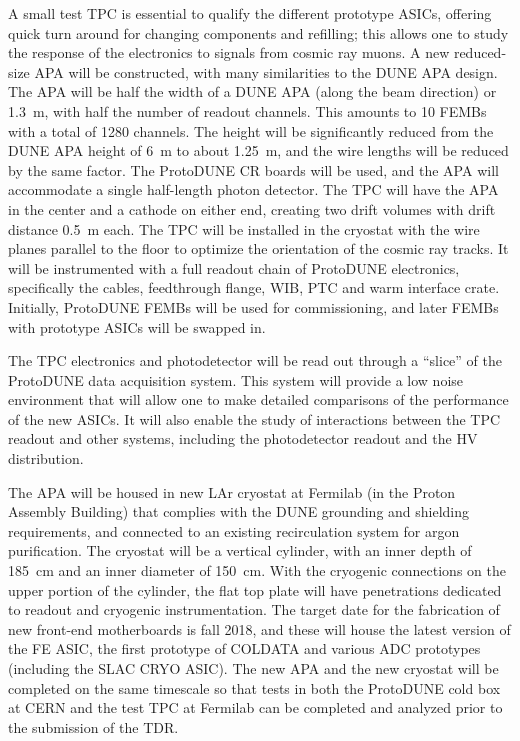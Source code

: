 A small test TPC is essential to qualify the different prototype ASICs, offering quick turn around for changing components and refilling; this allows one to study the response of the electronics to signals from cosmic ray muons.  A new reduced-size APA will be constructed, with many similarities to the DUNE APA design.  The APA will be half the width of a DUNE APA (along the beam direction) or 1.3~m, with half the number of readout channels.  This amounts to 10 FEMBs with a total of 1280 channels.  The height will be significantly reduced from the DUNE APA height of 6~m to about 1.25~m, and the wire lengths will be reduced by the same factor.  The ProtoDUNE CR boards will be used, and  the APA will accommodate a single half-length photon detector.  The TPC will have the APA in the center and a cathode on either end, creating two drift volumes with drift distance 0.5~m each.  The TPC will be installed in the cryostat with the wire planes parallel to the floor to optimize the orientation of the cosmic ray tracks.  It will be instrumented with a full readout chain of ProtoDUNE electronics, specifically  the cables, feedthrough flange, WIB, PTC and warm interface crate.  Initially, ProtoDUNE FEMBs will be used for commissioning, and later FEMBs with prototype ASICs will be swapped in.

The TPC electronics and photodetector will be read out through a ``slice'' of the ProtoDUNE data acquisition system.  This system will provide a low noise environment that will allow one to make detailed comparisons of the performance of the new ASICs. It will also enable the study of interactions between the TPC readout and other systems, including the photodetector readout and the HV distribution.
 
The APA will be housed in new LAr cryostat at Fermilab (in the Proton Assembly Building) that complies with the DUNE grounding and shielding requirements, and connected to an existing recirculation system for argon purification.  The cryostat will be a vertical cylinder, with an inner depth of 185~cm and an inner diameter of 150~cm.  With the cryogenic connections on the upper portion of the cylinder, the flat top plate will have penetrations dedicated to readout and cryogenic instrumentation.  The target date for the fabrication of new front-end motherboards is fall 2018, and these will house the latest version of the FE ASIC, the first prototype of COLDATA and various ADC prototypes (including the SLAC CRYO ASIC).  The new APA and the new cryostat will be completed on the same timescale so that tests in both the ProtoDUNE cold box at CERN and the test TPC at Fermilab can be completed and analyzed prior to the submission of the TDR.  
